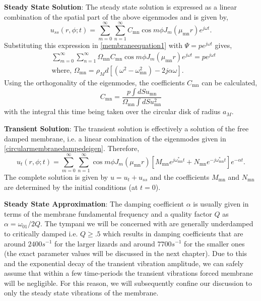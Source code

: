\noindent\textbf{Steady State Solution}: The steady state solution is expressed as a linear combination of the spatial part
of the above eigenmodes and is given by,
\begin{equation}\label{membraness1}
 u_{ss}(r,\phi ;t)=\displaystyle\sum^\infty_{m=0}\sum^\infty_{n=1} C_{\mathrm{mn}}\cos m\phi J_m(\mu_{\mathrm{mn}} r)e^{j\omega t}.
\end{equation}
Substituting this expression in \eqref{membraneequation1} with $\Psi=pe^{j\omega t}$ gives,
\begin{align}
 &\displaystyle\sum^\infty_{m=0}\sum^\infty_{n=1} \Omega_{\mathrm{mn}}C_{\mathrm{mn}}\cos m\phi J_m(\mu_{\mathrm{mn}} r)e^{j\omega t}=pe^{j\omega t}\label{membraness2}\\
 &\text{where,  }\Omega_{\mathrm{mn}}=\rho_M d \left[(\omega^2-\omega^2_{\mathrm{mn}})-2j\alpha\omega\right]\label{omegafirstdef}.
\end{align}
Using the orthogonality of the eigenmodes, the coefficients $C_{\mathrm{mn}}$ can be calculated,
\begin{equation}\label{sscoeffs}
 C_{\mathrm{mn}}=\frac{p\int dS u_{\mathrm{mn}}}{\Omega_{\mathrm{mn}}\int dS u^2_{\mathrm{mn}}}
\end{equation}
with the integral this time being taken over the circular disk of radius $a_M$.

\vspace{\baselineskip}
\noindent\textbf{Transient Solution}: The transient solution is effectively a solution of the free damped membrane, i.e. a linear 
combination of the eigenmodes given in \eqref{circularmembranedampedeigen}. Therefore,
\begin{equation}\label{membranet1}
 u_t(r,\phi;t)=\displaystyle\sum^\infty_{m=0}\sum^\infty_{n=1}\cos m\phi J_m(\mu_{\mathrm{mn}} r)\left[M_{\mathrm{mn}}e^{j\omega_{\mathrm{mn}}^* t}+N_{\mathrm{mn}}e^{-j\omega_{\mathrm{mn}}^* t}\right]e^{-\alpha t}.
\end{equation}
The complete solution is given by $u=u_t+u_{ss}$ and the coefficients $M_{\mathrm{mn}}$ and $N_{\mathrm{mn}}$ are determined by the initial conditions (at $t=0$).

\vspace{\baselineskip}
\textbf{Steady State Approximation}: The damping coefficient $\alpha$ is usually given in terms of the membrane fundamental frequency and a quality factor $Q$ as $\alpha=\omega_{01}/2Q$. 
The tympani we will be concerned with are generally underdamped to critically damped i.e. $Q\geq .5$ which results in damping coefficients that are around $2400s^{-1} $ for the larger lizards and around $7700s^{-1}$ for the smaller ones
(the exact parameter values will be discussed in the next chapter). 
Due to this and the exponential decay of the transient vibration amplitude, we can safely assume that within a few time-periods the transient vibrations
forced membrane will be negligible. For this reason, we will subsequently confine our discussion to only the steady state vibrations of the membrane.
